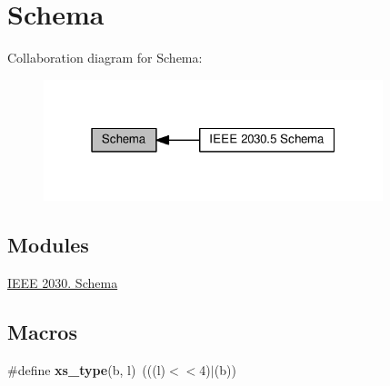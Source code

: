 \hypertarget{group__schema}{}\section{Schema}
\label{group__schema}
Collaboration diagram for Schema\+:\nopagebreak
\begin{figure}[H]
\begin{center}
\leavevmode
\includegraphics[width=280pt]{group__schema}
\end{center}
\end{figure}
\subsection*{Modules}
\begin{DoxyCompactItemize}
\item 
\hyperlink{group__se__object}{I\+E\+E\+E 2030. Schema}
\end{DoxyCompactItemize}
\subsection*{Macros}
\begin{DoxyCompactItemize}
\item 
\mbox{\label{group__schema_gae752315e97aafce8b5c8e9e20aff6a33}} 
\#define {\bfseries xs\+\_\+type}(b,  l)~(((l)$<$$<$4)$\vert$(b))
\end{DoxyCompactItemize}
